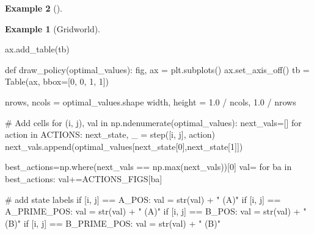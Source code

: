 \documentclass[
  letterpaper,
]{krantz}
\makeatletter
\newenvironment{Shaded}{\begin{snugshade}}{\end{snugshade}}
\newcommand{\BuiltInTok}[1]{\textcolor[rgb]{0.00,0.23,0.31}{#1}}
\newcommand{\CommentTok}[1]{\textcolor[rgb]{0.37,0.37,0.37}{#1}}
\newcommand{\ControlFlowTok}[1]{\textcolor[rgb]{0.00,0.23,0.31}{#1}}
\newcommand{\DecValTok}[1]{\textcolor[rgb]{0.68,0.00,0.00}{#1}}
\newcommand{\FloatTok}[1]{\textcolor[rgb]{0.68,0.00,0.00}{#1}}
\newcommand{\KeywordTok}[1]{\textcolor[rgb]{0.00,0.23,0.31}{#1}}
\newcommand{\NormalTok}[1]{\textcolor[rgb]{0.00,0.23,0.31}{#1}}
\newcommand{\OperatorTok}[1]{\textcolor[rgb]{0.37,0.37,0.37}{#1}}
\newcommand{\StringTok}[1]{\textcolor[rgb]{0.13,0.47,0.30}{#1}}
\newenvironment{kframe}{%
\medskip{}
\setlength{\fboxsep}{.8em}
 \def\at@end@of@kframe{}%
 \ifinner\ifhmode%
  \def\at@end@of@kframe{\end{minipage}}%
  \begin{minipage}{\columnwidth}%
 \fi\fi%
 \def\FrameCommand##1{\hskip\@totalleftmargin \hskip-\fboxsep
 \colorbox{shadecolor}{##1}\hskip-\fboxsep
     \hskip-\linewidth \hskip-\@totalleftmargin \hskip\columnwidth}%
 \MakeFramed {\advance\hsize-\width
   \@totalleftmargin\z@ \linewidth\hsize
   \@setminipage}}%
 {\par\unskip\endMakeFramed%
 \at@end@of@kframe}
\renewenvironment{Shaded}{\begin{kframe}}{\end{kframe}}
\theoremstyle{plain}
\theoremstyle{definition}
\newtheorem{example}{Example}[chapter]
\theoremstyle{definition}
\theoremstyle{remark}
\makeatother
\begin{document}
\begin{example}[]
\begin{example}[Gridworld]
\begin{tcolorbox}[enhanced jigsaw, bottomrule=.15mm, opacityback=0, breakable, colframe=quarto-callout-tip-color-frame, left=2mm, rightrule=.15mm, toprule=.15mm, leftrule=.75mm, arc=.35mm, colback=white]
\begin{codelisting}[H]
\begin{Shaded}
\begin{Highlighting}[]
\NormalTok{    ax.add\_table(tb)}

\KeywordTok{def}\NormalTok{ draw\_policy(optimal\_values):}
\NormalTok{    fig, ax }\OperatorTok{=}\NormalTok{ plt.subplots()}
\NormalTok{    ax.set\_axis\_off()}
\NormalTok{    tb }\OperatorTok{=}\NormalTok{ Table(ax, bbox}\OperatorTok{=}\NormalTok{[}\DecValTok{0}\NormalTok{, }\DecValTok{0}\NormalTok{, }\DecValTok{1}\NormalTok{, }\DecValTok{1}\NormalTok{])}

\NormalTok{    nrows, ncols }\OperatorTok{=}\NormalTok{ optimal\_values.shape}
\NormalTok{    width, height }\OperatorTok{=} \FloatTok{1.0} \OperatorTok{/}\NormalTok{ ncols, }\FloatTok{1.0} \OperatorTok{/}\NormalTok{ nrows}

    \CommentTok{\# Add cells}
    \ControlFlowTok{for}\NormalTok{ (i, j), val }\KeywordTok{in}\NormalTok{ np.ndenumerate(optimal\_values):}
\NormalTok{        next\_vals}\OperatorTok{=}\NormalTok{[]}
        \ControlFlowTok{for}\NormalTok{ action }\KeywordTok{in}\NormalTok{ ACTIONS:}
\NormalTok{            next\_state, \_ }\OperatorTok{=}\NormalTok{ step([i, j], action)}
\NormalTok{            next\_vals.append(optimal\_values[next\_state[}\DecValTok{0}\NormalTok{],next\_state[}\DecValTok{1}\NormalTok{]])}

\NormalTok{        best\_actions}\OperatorTok{=}\NormalTok{np.where(next\_vals }\OperatorTok{==}\NormalTok{ np.}\BuiltInTok{max}\NormalTok{(next\_vals))[}\DecValTok{0}\NormalTok{]}
\NormalTok{        val}\OperatorTok{=}\StringTok{\textquotesingle{}\textquotesingle{}}
        \ControlFlowTok{for}\NormalTok{ ba }\KeywordTok{in}\NormalTok{ best\_actions:}
\NormalTok{            val}\OperatorTok{+=}\NormalTok{ACTIONS\_FIGS[ba]}
        
        \CommentTok{\# add state labels}
        \ControlFlowTok{if}\NormalTok{ [i, j] }\OperatorTok{==}\NormalTok{ A\_POS:}
\NormalTok{            val }\OperatorTok{=} \BuiltInTok{str}\NormalTok{(val) }\OperatorTok{+} \StringTok{" (A)"}
        \ControlFlowTok{if}\NormalTok{ [i, j] }\OperatorTok{==}\NormalTok{ A\_PRIME\_POS:}
\NormalTok{            val }\OperatorTok{=} \BuiltInTok{str}\NormalTok{(val) }\OperatorTok{+} \StringTok{" (A\textquotesingle{})"}
        \ControlFlowTok{if}\NormalTok{ [i, j] }\OperatorTok{==}\NormalTok{ B\_POS:}
\NormalTok{            val }\OperatorTok{=} \BuiltInTok{str}\NormalTok{(val) }\OperatorTok{+} \StringTok{" (B)"}
        \ControlFlowTok{if}\NormalTok{ [i, j] }\OperatorTok{==}\NormalTok{ B\_PRIME\_POS:}
\NormalTok{            val }\OperatorTok{=} \BuiltInTok{str}\NormalTok{(val) }\OperatorTok{+} \StringTok{" (B\textquotesingle{})"}
        

\end{Highlighting}
\end{Shaded}
\end{codelisting}
\end{tcolorbox}
\end{example}
\end{example}
\end{document}
